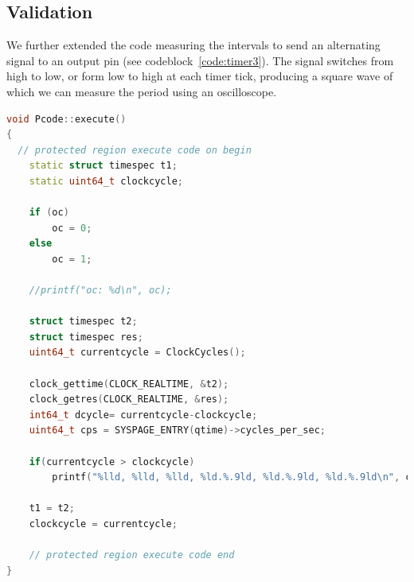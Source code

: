 \documentclass[a4paper,twoside,11pt]{article}
\begin{document}
\FloatBarrier
\subsection{Validation}
We further extended the code measuring the intervals to send an alternating signal to an output pin (see codeblock~\ref{code:timer3}). The signal switches from high to low, or form low to high at each timer tick, producing a square wave of which we can measure the period using an oscilloscope.

\begin{lstlisting}[caption=Pcode::execute (extended), label=code:timer3, language=C++]
void Pcode::execute()
{
  // protected region execute code on begin
	static struct timespec t1;
	static uint64_t clockcycle;

	if (oc)
		oc = 0;
	else
		oc = 1;

	//printf("oc: %d\n", oc);

	struct timespec t2;
	struct timespec res;
	uint64_t currentcycle = ClockCycles();

	clock_gettime(CLOCK_REALTIME, &t2);
	clock_getres(CLOCK_REALTIME, &res);
	int64_t dcycle= currentcycle-clockcycle;
	uint64_t cps = SYSPAGE_ENTRY(qtime)->cycles_per_sec;

	if(currentcycle > clockcycle)
		printf("%lld, %lld, %lld, %ld.%.9ld, %ld.%.9ld, %ld.%.9ld\n", currentcycle, clockcycle, cps, res.tv_sec, res.tv_nsec, t2.tv_sec, t2.tv_nsec, t1.tv_sec, t1.tv_nsec);

	t1 = t2;
	clockcycle = currentcycle;

	// protected region execute code end
}
\end{lstlisting}
\end{document}
